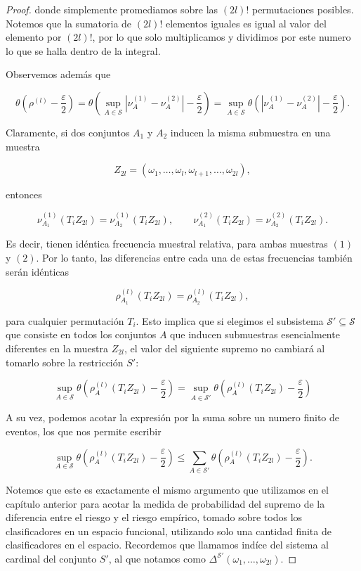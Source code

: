 \documentclass{report}
\begin{document}
\begin{proof}
donde simplemente promediamos sobre las \((2l)!\) permutaciones posibles. Notemos que la sumatoria de \((2l)!\) elementos iguales
es igual al valor del elemento por \((2l)!\), por lo que solo multiplicamos y dividimos por este numero lo que se halla dentro de la integral.

Observemos además que

\[
\theta \left( \rho^{(l)} - \frac{\varepsilon}{2} \right) = \theta \left( \sup_{A \in \mathcal{S}} \left| \nu^{(1)}_A - \nu^{(2)}_A \right| -
 \frac{\varepsilon}{2} \right) = \sup_{A \in \mathcal{S}} \theta \left( \left| \nu^{(1)}_A - \nu^{(2)}_A \right| - \frac{\varepsilon}{2} \right).
\]

Claramente, si dos conjuntos \( A_1 \) y \( A_2 \) inducen la misma submuestra en una muestra

\[
Z_{2l} = (\omega_1, \dots, \omega_l, \omega_{l+1}, \dots, \omega_{2l}),
\]

entonces

\[
\nu^{(1)}_{A_1}(T_i Z_{2l}) = \nu^{(1)}_{A_2}(T_i Z_{2l}), \qquad \nu^{(2)}_{A_1}(T_i Z_{2l}) = \nu^{(2)}_{A_2}(T_i Z_{2l}).
\]

Es decir, tienen idéntica frecuencia muestral relativa, para ambas muestras $(1)$ y $(2)$. Por lo tanto, las diferencias entre cada una de estas frecuencias también serán idénticas

\[
\rho^{(l)}_{A_1}(T_i Z_{2l}) = \rho^{(l)}_{A_2}(T_i Z_{2l}),
\]

para cualquier permutación \( T_i \). Esto implica que si elegimos el subsistema \( \mathcal{S}' \subseteq \mathcal{S} \)
 que consiste en todos los conjuntos \( A \) que inducen submuestras esencialmente diferentes en la muestra \( Z_{2l} \),
el valor del siguiente supremo no cambiará al tomarlo sobre la restricción $S'$:

\[
\sup_{A \in \mathcal{S}} \theta \left( \rho^{(l)}_A(T_i Z_{2l}) - \frac{\varepsilon}{2} \right) =
\sup_{A \in \mathcal{S}'} \theta \left( \rho^{(l)}_A(T_i Z_{2l}) - \frac{\varepsilon}{2} \right)
\]

A su vez, podemos acotar la expresión por la suma sobre un numero finito de eventos, los que nos permite escribir

\[
\sup_{A \in \mathcal{S}} \theta \left( \rho^{(l)}_A(T_i Z_{2l}) - \frac{\varepsilon}{2} \right)
\leq \sum_{A \in \mathcal{S}'} \theta \left( \rho^{(l)}_A(T_i Z_{2l}) - \frac{\varepsilon}{2} \right).
\]

Notemos que este es exactamente el mismo argumento que utilizamos en el capítulo anterior para acotar la medida de probabilidad del supremo de la diferencia
entre el riesgo y el riesgo empírico, tomado sobre todos los clasificadores en un espacio funcional, utilizando solo una cantidad finita de clasificadores en el espacio.
Recordemos que llamamos indíce del sistema al cardinal del conjunto $S'$, al que notamos como $ \Delta^{\mathcal{S'}}(\omega_1, \dots, \omega_{2l})$.


\end{proof}
\end{document}
